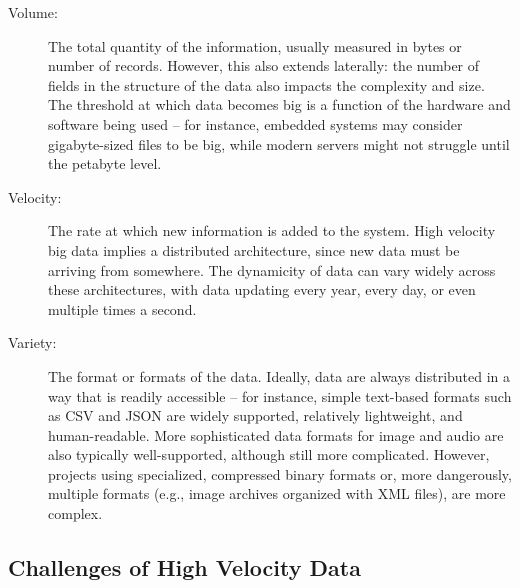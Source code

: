 \begin{description}
	\item[Volume:] The total quantity of the information, usually measured in bytes or number of records. However, this also extends laterally: the number of fields in the structure of the data also impacts the complexity and size. The threshold at which data becomes big is a function of the hardware and software being used -- for instance, embedded systems may consider gigabyte-sized files to be big, while modern servers might not struggle until the petabyte level.
	\item[Velocity:] The rate at which new information is added to the system. High velocity big data implies a distributed architecture, since new data must be arriving from somewhere. The dynamicity of data can vary widely across these architectures, with data updating every year, every day, or even multiple times a second.
	\item[Variety:] The format or formats of the data. Ideally, data are always distributed in a way that is readily accessible -- for instance, simple text-based formats such as CSV and JSON are widely supported, relatively lightweight, and human-readable. More sophisticated data formats for image and audio are also typically well-supported, although still more complicated. However, projects using specialized, compressed binary formats or, more dangerously, multiple formats (e.g., image archives organized with XML files), are more complex.
\end{description}

\subsection{Challenges of High Velocity Data}

